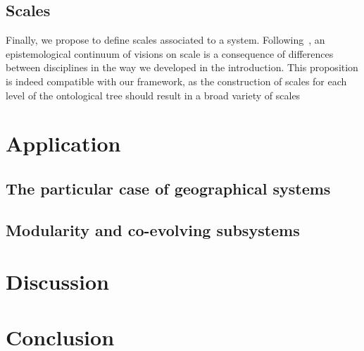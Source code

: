 \subsection*{Scales}

Finally, we propose to define scales associated to a system. Following~\cite{manson2008does}, an epistemological continuum of visions on scale is a consequence of differences between disciplines in the way we developed in the introduction. This proposition is indeed compatible with our framework, as the construction of scales for each level of the ontological tree should result in a broad variety of scales 


\section*{Application}

\subsection*{The particular case of geographical systems}

\cite{dollfus1975some} %


\subsection*{Modularity and co-evolving subsystems}



\section*{Discussion}



\section*{Conclusion}











